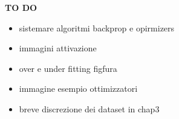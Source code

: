 
{\huge \textbf{TO DO}}

\begin{itemize}
    \item sistemare algoritmi backprop e opirmizers
    \item immagini attivazione
    \item over e under fitting figfura
    \item immagine esempio ottimizzatori
    \item breve discrezione dei dataset in chap3
\end{itemize}